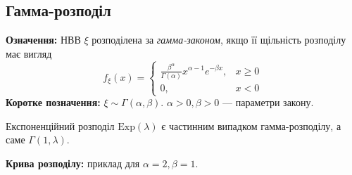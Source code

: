 \subsection{Гамма-розподіл}
\noindent\textbf{Означення:}
    НВВ $\xi$ розподілена за \emph{гамма-законом}, 
    якщо її щільність розподілу має вигляд 
    \begin{equation}
        f_\xi(x) = \begin{cases}
            \frac{\beta^\alpha}{\Gamma(\alpha)} x^{\alpha-1} e^{-\beta x}, & x \geq 0 \\
            0, & x < 0
        \end{cases}
    \end{equation}
\textbf{Коротке позначення:} $\xi \sim {\Gamma}(\alpha, \beta)$.
    $\alpha >0, \beta > 0$ --- параметри закону.
\begin{remark}
    Експоненційний розподіл $\mathrm{Exp}(\lambda)$ є частинним випадком гамма-розподілу, а саме ${\Gamma}(1, \lambda)$.
\end{remark}
\begin{samepage}
    \noindent \textbf{Крива розподілу:} приклад для $\alpha = 2, \beta=1$.
    \begin{center}
    \end{center}
\end{samepage}


